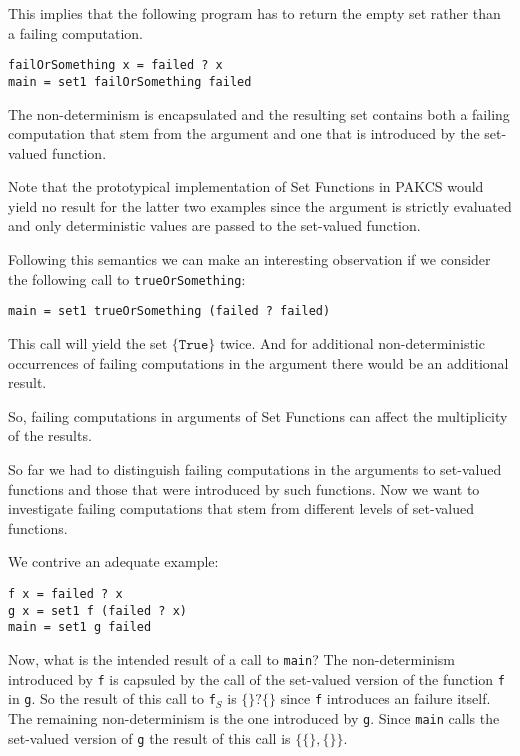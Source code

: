 \documentclass{article}
\begin{document}
This implies that the following program has to return the empty set
rather than a failing computation.

\begin{lstlisting}
failOrSomething x = failed ? x
main = set1 failOrSomething failed
\end{lstlisting}

The non-determinism is encapsulated and the resulting set contains both a failing
computation that stem from the argument and one that is introduced by the set-valued
function. 

Note that the prototypical implementation of Set Functions in PAKCS would yield no 
result for the latter two examples since the argument is strictly evaluated and
only deterministic values are passed to the set-valued function.

Following this semantics we can make an interesting observation if we consider
the following call to \lstinline{trueOrSomething}:

\begin{lstlisting}
main = set1 trueOrSomething (failed ? failed)
\end{lstlisting}

This call will yield the set $\{\texttt{True}\}$ twice. And for additional
non-deterministic occurrences of failing computations in the argument there
would be an additional result. 

So, failing computations in arguments of Set Functions can affect the
multiplicity of the results.

So far we had to distinguish failing computations in the arguments to
set-valued functions and those that were introduced by such functions.
Now we want to investigate failing computations that stem from different
levels of set-valued functions. 

We contrive an adequate example:

\begin{lstlisting}
f x = failed ? x
g x = set1 f (failed ? x)
main = set1 g failed
\end{lstlisting}

Now, what is the intended result of a call to \lstinline{main}? The non-determinism
introduced by \lstinline{f} is capsuled by the call of the set-valued version of the
function \lstinline{f} in \lstinline{g}. So the result of this call to \lstinline{f}$_{S}$
is $\{\}?\{\}$ since \lstinline{f} introduces an failure itself. The remaining non-determinism
is the one introduced by \lstinline{g}. Since \lstinline{main} calls the set-valued version
of \lstinline{g} the result of this call is $\{\{\},\{\}\}$.
\end{document}
